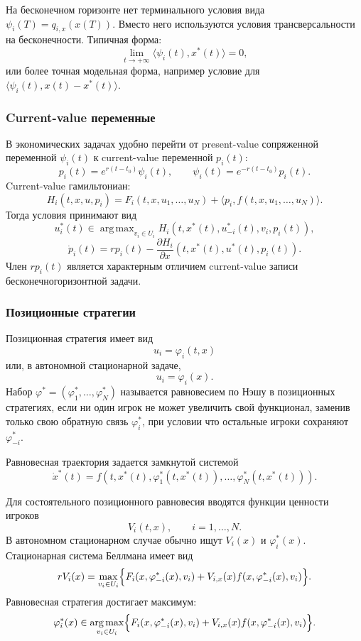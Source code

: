 \documentclass[12pt,a4paper]{article}
\DeclareMathOperator*{\argmax}{arg\,max}
\begin{document}
На бесконечном горизонте нет терминального условия вида $\psi_i(T)=q_{i,x}(x(T))$. Вместо него используются условия трансверсальности на бесконечности. Типичная форма:
\[
 \lim_{t\to+\infty}\langle\psi_i(t),x^*(t)\rangle=0,
\]
или более точная модельная форма, например условие для $\langle \psi_i(t),x(t)-x^*(t)\rangle$.

\subsubsection{Current-value переменные}

В экономических задачах удобно перейти от present-value сопряженной переменной $\psi_i(t)$ к current-value переменной $p_i(t)$:
\[
 p_i(t)=e^{r(t-t_0)}\psi_i(t),\qquad \psi_i(t)=e^{-r(t-t_0)}p_i(t).
\]
Current-value гамильтониан:
\[
 H_i(t,x,u,p_i)=F_i(t,x,u_1,\ldots,u_N)+\langle p_i,f(t,x,u_1,\ldots,u_N)\rangle.
\]
Тогда условия принимают вид
\[
 u_i^*(t)\in\argmax_{v_i\in U_i}H_i(t,x^*(t),u_{-i}^*(t),v_i,p_i(t)),
\]
\[
 \dot p_i(t)=r p_i(t)-\frac{\partial H_i}{\partial x}(t,x^*(t),u^*(t),p_i(t)).
\]
Член $r p_i(t)$ является характерным отличием current-value записи бесконечногоризонтной задачи.

\subsubsection{Позиционные стратегии}

Позиционная стратегия имеет вид
\[
 u_i=\varphi_i(t,x)
\]
или, в автономной стационарной задаче,
\[
 u_i=\varphi_i(x).
\]
Набор $\varphi^*=(\varphi_1^*,\ldots,\varphi_N^*)$ называется равновесием по Нэшу в позиционных стратегиях, если ни один игрок не может увеличить свой функционал, заменив только свою обратную связь $\varphi_i^*$, при условии что остальные игроки сохраняют $\varphi_{-i}^*$.

Равновесная траектория задается замкнутой системой
\[
 \dot x^*(t)=f(t,x^*(t),\varphi_1^*(t,x^*(t)),\ldots,\varphi_N^*(t,x^*(t))).
\]

Для состоятельного позиционного равновесия вводятся функции ценности игроков
\[
 V_i(t,x),\qquad i=1,\ldots,N.
\]
В автономном стационарном случае обычно ищут $V_i(x)$ и $\varphi_i^*(x)$. Стационарная система Беллмана имеет вид
\[
 rV_i(x)=\max_{v_i\in U_i}\Bigl\{F_i(x,\varphi_{-i}^*(x),v_i)+V_{i,x}(x)f(x,\varphi_{-i}^*(x),v_i)\Bigr\}.
\]
Равновесная стратегия достигает максимум:
\[
 \varphi_i^*(x)\in\argmax_{v_i\in U_i}\Bigl\{F_i(x,\varphi_{-i}^*(x),v_i)+V_{i,x}(x)f(x,\varphi_{-i}^*(x),v_i)\Bigr\}.
\]
\end{document}
